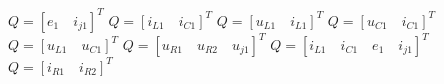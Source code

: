 $Q=[e_1\quad i_{j1}]^T$
$Q=[i_{L1}\quad i_{C1}]^T$
$Q=[u_{L1}\quad i_{L1}]^T$
$Q=[u_{C1}\quad i_{C1}]^T$
$Q=[u_{L1}\quad u_{C1}]^T$
$Q=[u_{R1}\quad u_{R2}\quad u_{j1}]^T$
$Q=[i_{L1}\quad i_{C1}\quad e_1\quad i_{j1}]^T$
$Q=[i_{R1}\quad i_{R2}]^T$
